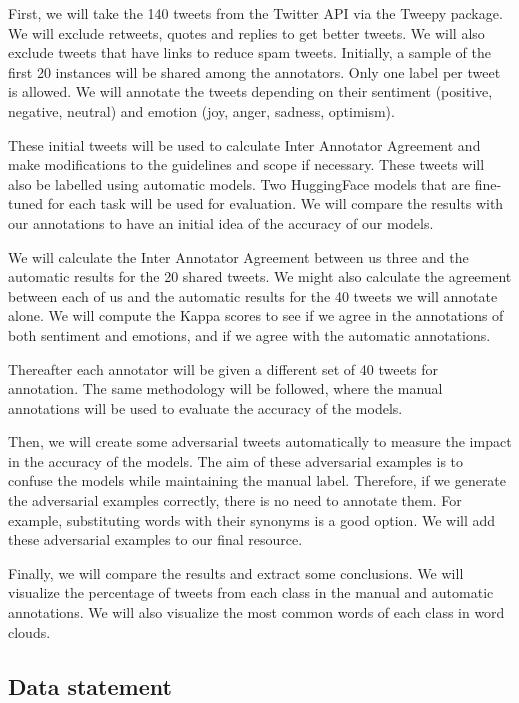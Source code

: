 \documentclass[11pt,a4paper]{article}
\begin{document}
First, we will take the 140 tweets from the Twitter API via the Tweepy package. We will exclude retweets, quotes and replies to get better tweets. We will also exclude tweets that have links to reduce spam tweets. Initially, a sample of the first 20 instances will be shared among the annotators. Only one label per tweet is allowed. We will annotate the tweets depending on their sentiment (positive, negative, neutral) and emotion (joy, anger, sadness, optimism).

These initial tweets will be used to calculate Inter Annotator Agreement and make modifications to the guidelines and scope if necessary. These tweets will also be labelled using automatic models. Two HuggingFace models that are fine-tuned for each task will be used for evaluation. We will compare the results with our annotations to have an initial idea of the accuracy of our models.

We will calculate the Inter Annotator Agreement between us three and the automatic results for the 20 shared tweets. We might also calculate the agreement between each of us and the automatic results for the 40 tweets we will annotate alone.
We will compute the Kappa scores to see if we agree in the annotations of both sentiment and emotions, and if we agree with the automatic annotations.

Thereafter each annotator will be given a different set of 40 tweets for annotation. The same methodology will be followed, where the manual annotations will be used to evaluate the accuracy of the models.

Then, we will create some adversarial tweets automatically to measure the impact in the accuracy of the models. The aim of these adversarial examples is to confuse the models while maintaining the manual label. Therefore, if we generate the adversarial examples correctly, there is no need to annotate them. For example, substituting words with their synonyms is a good option. We will add these adversarial examples to our final resource.

Finally, we will compare the results and extract some conclusions. We will visualize the percentage of tweets from each class in the manual and automatic annotations. We will also visualize the most common words of each class in word clouds.

\subsection{Data statement}
\end{document}
